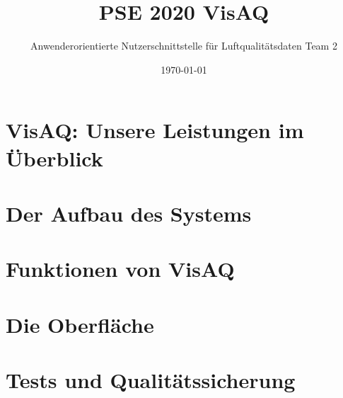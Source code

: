 

\title{PSE 2020 \textbf{VisAQ}}
\subtitle{Anwenderorientierte Nutzerschnittstelle für Luftqualitätsdaten Team 2}
\date{\today}

\usetikzlibrary{matrix}
\usetikzlibrary{arrows.meta}
\usetikzlibrary{automata}
\usetikzlibrary{tikzmark}
\usetikzlibrary{arrows}
\usetikzlibrary{positioning}
\usetikzlibrary{quotes}

\usetikzlibrary{shapes}


\titleframe


\roadmap

\section{VisAQ: Unsere Leistungen im Überblick}

\section{Der Aufbau des Systems}

\section{Funktionen von VisAQ}

\section{Die Oberfläche}

\section{Tests und Qualitätssicherung}

\section{}
\questionframe
\lastframe
